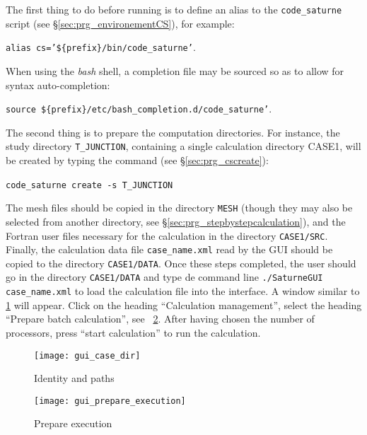 The first thing to do before running \CS is to define an alias to the \texttt{code\_saturne} script
(see \S\ref{sec:prg_environementCS}), for example:
\begin{center}
\texttt{alias cs='\$\{prefix\}/bin/code\_saturne'}.
\end{center}
When using the \emph{bash} shell, a completion file may be sourced so as to
allow for syntax auto-completion:
\begin{center}
\texttt{source \$\{prefix\}/etc/bash\_completion.d/code\_saturne'}.
\end{center}
The second thing is to prepare the computation directories. For instance, the study directory \texttt{T\_JUNCTION}, containing a single calculation directory CASE1, will be created by typing the command (see \S\ref{sec:prg_cscreate}):\
\begin{center}
\texttt{code\_saturne create -s T\_JUNCTION}\
\end{center}
The mesh files should be copied in the directory \texttt{MESH} (though they may also be selected from another directory, see \S\ref{sec:prg_stepbystepcalculation}),
and the Fortran user files necessary for the calculation in the directory \texttt{CASE1/SRC}.  Finally, the calculation data file \texttt{case\_name.xml} read by the GUI should be copied to the directory \texttt{CASE1/DATA}.
Once these steps completed, the user should go in the directory \texttt{CASE1/DATA} and type de command line \texttt{./SaturneGUI case\_name.xml} to load the calculation file into the interface. A window similar to \figurename\ref{fig:3_e1} will appear. Click on the heading ``Calculation management'', select the heading ``Prepare batch calculation'', see \figurename~\ref{fig:43_e1}. After having chosen the number of processors, press ``start calculation'' to run the calculation.

\begin{figure}[!ht]
\begin{center}
\texttt{[image: gui\_case\_dir]}
\caption{Identity and paths}
\label{fig:3_e1}
\end{center}
\end{figure}

\begin{figure}[!ht]
\begin{center}
\texttt{[image: gui\_prepare\_execution]}
\caption{Prepare execution}
\label{fig:43_e1}
\end{center}
\end{figure}

